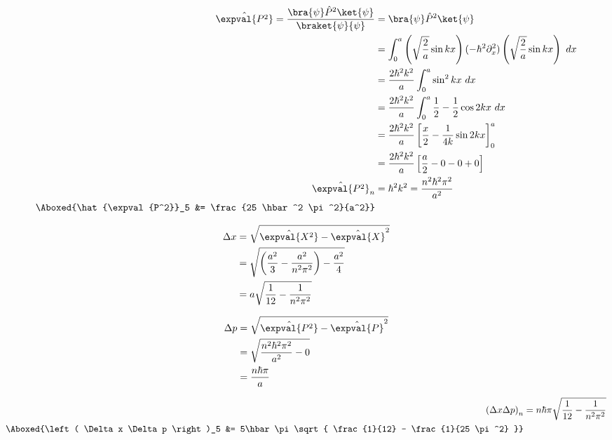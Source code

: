 \documentclass{article}
\begin{document}
\begin{enumerate}
		\begin{equation}
			\begin{split}
				\hat{\expval{P^2}} = \frac{\bra{\psi}\hat{P}^2\ket{\psi}}{\braket{\psi}{\psi}} &= \bra{\psi}\hat{P}^2\ket{\psi} \\
				&= \int_{0}^{a} \left( \sqrt{\frac{2}{a}} \sin kx \right) (-\hbar^2 \partial^2_x) \left( \sqrt{\frac{2}{a}} \sin kx \right) \ dx \\
				&= \frac{2\hbar^2 k^2}{a} \int_{0}^{a} \sin^2 kx \ dx \\
				&= \frac{2\hbar^2 k^2}{a} \int_{0}^{a} \frac{1}{2} - \frac{1}{2} \cos 2kx \ dx \\
				&= \frac{2\hbar^2 k^2}{a} \left[ \frac{x}{2} - \frac{1}{4k} \sin 2kx \right]^a_0 \\
				&= \frac{2\hbar^2 k^2}{a} \left[ \frac{a}{2} - 0 - 0 + 0 \right] \\
				\hat{\expval{P^2}}_n &= \hbar^2 k^2 = \frac{n^2 \hbar^2 \pi^2}{a^2} \\
				\Aboxed{\hat{\expval{P^2}}_5 &= \frac{25 \hbar^2 \pi^2}{a^2}}
			\end{split}
		\end{equation}
		
		\begin{minipage}{0.45\textwidth}
			\begin{equation}
				\begin{split}
					\Delta x &= \sqrt{ \hat{\expval{X^2}} - \hat{\expval{X}}^2} \\
					&= \sqrt{ \left( \frac{a^2}{3} - \frac{a^2}{n^2 \pi^2} \right) - \frac{a^2}{4} } \\
					&= a \sqrt{ \frac{1}{12} - \frac{1}{n^2 \pi^2} }
				\end{split}
			\end{equation}
		\end{minipage}
		\begin{minipage}{0.45\textwidth}
			\begin{equation}
				\begin{split}
					\Delta p &= \sqrt{ \hat{\expval{P^2}} - \hat{\expval{P}}^2} \\
					&= \sqrt{ \frac{n^2 \hbar^2 \pi^2}{a^2} - 0 } \\
					&= \frac{n \hbar \pi}{a}
				\end{split}
			\end{equation}
		\end{minipage}
		
		\begin{equation}
			\begin{split}
				\left( \Delta x \Delta p \right)_n &= n \hbar \pi \sqrt{ \frac{1}{12} - \frac{1}{n^2 \pi^2} } \\
				\Aboxed{\left( \Delta x \Delta p \right)_5 &= 5\hbar \pi \sqrt{ \frac{1}{12} - \frac{1}{25 \pi^2} }}
			\end{split}
		\end{equation}
		
	\end{enumerate}
	
\end{document}
